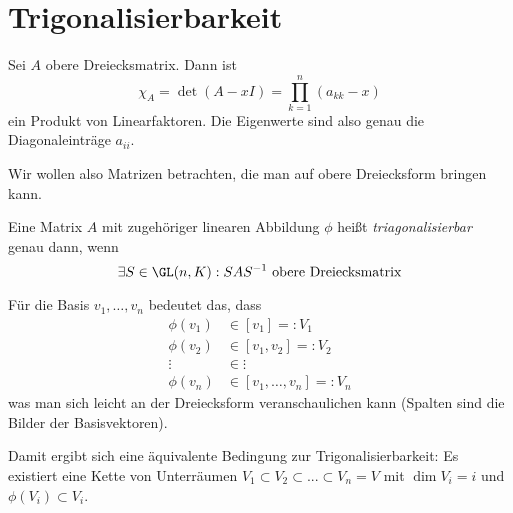 \documentclass[a4paper, 10pt]{scrbook}
\begin{document}
\section{Trigonalisierbarkeit}


\begin{ex}
Sei $A$ obere Dreiecksmatrix.
Dann ist
\[
\chi_A = \det(A-xI) = \prod_{k=1}^n(a_{kk}-x)
\]
ein Produkt von Linearfaktoren.
Die Eigenwerte sind also genau die Diagonaleinträge $a_{ii}$.
\end{ex}

Wir wollen also Matrizen betrachten, die man auf obere Dreiecksform bringen kann.

\begin{df}
\label{df:11.4}
Eine Matrix $A$ mit zugehöriger linearen Abbildung $\phi$ heißt \emph{triagonalisierbar} genau dann, wenn
\[
\exists S\in \GL(n, K): SAS^{-1} \text{ obere Dreiecksmatrix}
\]
\end{df}

Für die Basis $v_1,\dotsc,v_n$ bedeutet das, dass
\begin{align*}
\phi(v_1)&\in[v_1]=:V_1\\
\phi(v_2)&\in[v_1,v_2] =:V_2\\
\vdots &\in \vdots\\
\phi(v_n)&\in[v_1,\dotsc,v_n]=:V_n
\end{align*}
was man sich leicht an der Dreiecksform veranschaulichen kann (Spalten sind die Bilder der Basisvektoren).

Damit ergibt sich eine äquivalente Bedingung zur Trigonalisierbarkeit: 
Es existiert eine Kette von Unterräumen
$ V_1 \subset V_2 \subset ... \subset V_n=V $
mit $\dim V_i=i$ und $\phi(V_i)\subset V_i$.
\end{document}
